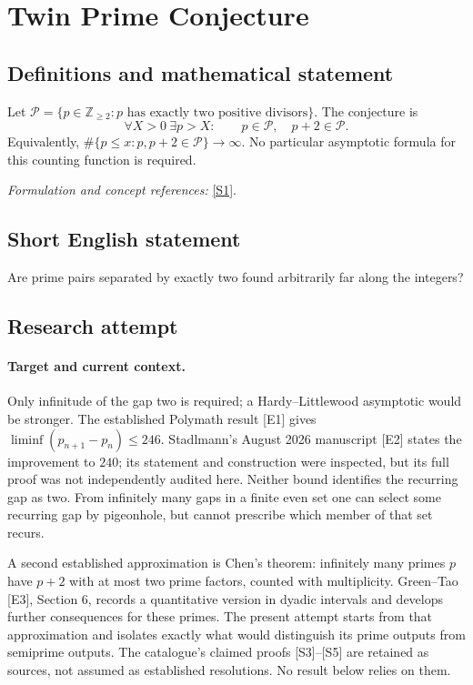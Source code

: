 \documentclass[11pt]{article}
\begin{document}
\section*{\texorpdfstring{Twin Prime Conjecture}{Twin Prime Conjecture}}\label{statement}
\subsection{Definitions and mathematical statement}
Let $\mathcal P=\{p\in{\mathbb{Z}}_{\ge2}:p\text{ has exactly two positive divisors}\}$. The conjecture is
\[
 \forall X>0\ \exists p>X:\qquad p\in\mathcal P,\quad p+2\in\mathcal P.
\]
Equivalently, $\#\{p\le x:p,p+2\in\mathcal P\}\to\infty$. No particular asymptotic formula for this counting function is required.
\par\smallskip\textit{Formulation and concept references:} \href{https://mathworld.wolfram.com/TwinPrimeConjecture.html}{[S1]}.

\subsection{Short English statement}
Are prime pairs separated by exactly two found arbitrarily far along the integers?
\subsection{Research attempt}

\paragraph{Target and current context.}
Only infinitude of the gap two is required; a Hardy--Littlewood
asymptotic would be stronger. The established Polymath result [E1]
gives $\liminf(p_{n+1}-p_n)\le246$. Stadlmann's August 2026 manuscript
[E2] states the improvement to $240$; its statement and construction were
inspected, but its full proof was not independently audited here. Neither
bound identifies the recurring gap as two. From infinitely many gaps in
a finite even set one can select some recurring gap by pigeonhole, but
cannot prescribe which member of that set recurs.

A second established approximation is Chen's theorem: infinitely many
primes $p$ have $p+2$ with at most two prime factors, counted with
multiplicity. Green--Tao [E3], Section 6, records a quantitative version
in dyadic intervals and develops further consequences for these primes.
The present attempt starts from that approximation and isolates exactly
what would distinguish its prime outputs from semiprime outputs. The
catalogue's claimed proofs [S3]--[S5] are retained as sources, not assumed
as established resolutions. No result below relies on them.
\end{document}
